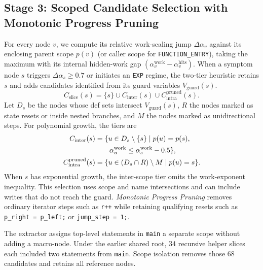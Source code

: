 \documentclass[10pt,conference]{IEEEtran}
\begin{document}
\subsection{Stage 3: Scoped Candidate Selection with Monotonic Progress Pruning}
For every node $v$, we compute its relative work-scaling jump $\Delta\alpha_v$ against its enclosing parent scope $p(v)$ (or caller scope for \texttt{FUNCTION\_ENTRY}), taking the maximum with its internal hidden-work gap $(\alpha_v^{\text{work}} - \alpha_v^{\text{hits}})$. When a symptom node $s$ triggers $\Delta\alpha_s \ge 0.7$ or initiates an \texttt{EXP} regime, the two-tier heuristic retains $s$ and adds candidates identified from its guard variables $V_{\text{guard}}(s)$.
\begin{equation}
C_{\text{slice}}(s) = \{s\} \cup C_{\text{inter}}(s) \cup C_{\text{intra}}^{\text{pruned}}(s).
\end{equation}
Let $D_s$ be the nodes whose def sets intersect $V_{\text{guard}}(s)$, $R$ the nodes marked as state resets or inside nested branches, and $M$ the nodes marked as unidirectional steps. For polynomial growth, the tiers are
\begin{align}
C_{\text{inter}}(s) &= \{u \in D_s \setminus \{s\} \mid p(u)=p(s), \notag\\
&\qquad \alpha_u^{\text{work}} \le \alpha_s^{\text{work}}-0.5\}, \\
C_{\text{intra}}^{\text{pruned}}(s) &= \{u \in (D_s \cap R) \setminus M \mid p(u)=s\}.
\end{align}
When $s$ has exponential growth, the inter-scope tier omits the work-exponent inequality. This selection uses scope and name intersections and can include writes that do not reach the guard. \emph{Monotonic Progress Pruning} removes ordinary iterator steps such as \texttt{r++} while retaining qualifying resets such as \texttt{p\_right = p\_left;} or \texttt{jump\_step = 1;}.

The extractor assigns top-level statements in \texttt{main} a separate scope without adding a macro-node. Under the earlier shared root, 34 recursive helper slices each included two statements from \texttt{main}. Scope isolation removes those 68 candidates and retains all reference nodes.
\end{document}
